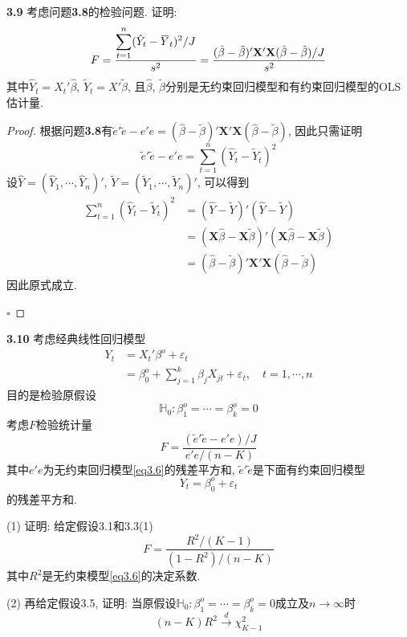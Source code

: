 \documentclass[cn,12pt,math=mtpro2,citestyle=gb7714-2015,bibstyle=gb7714-2015,twocol,mode=simple]{elegantbook}
\newcommand{\overbar}[1]{\mkern 1.5mu\overline{\mkern-1.5mu#1\mkern-1.5mu}\mkern 1.5mu}
\newcommand{\hbeta}{\hat{\beta}}
\newcommand{\tbeta}{\tilde{\beta}}
\begin{document}
\textbf{3.9} 考虑问题\textbf{3.8}的检验问题. 证明:
$$F=\frac{\displaystyle \sum_{t=1}^{n}(\hat{Y}_t-\overbar{Y}_t)^2/J}{s^2}=\frac{(\hbeta-\tbeta)'\mathbf{X}'\mathbf{X}(\hbeta-\tbeta)/J}{s^2}$$
其中$\hat{Y}_t=X_t'\hbeta$, $\tilde{Y}_t=X'\tbeta$, 且$\hbeta$, $\tbeta$分别是无约束回归模型和有约束回归模型的OLS估计量.

\begin{proof}
  根据问题\textbf{3.8}有$\tilde{e}'\tilde{e}-e'e=(\hbeta-\tbeta)'\mathbf{X}'\mathbf{X}(\hbeta-\tbeta)$, 因此只需证明
  $$\tilde{e}'\tilde{e}-e'e=\sum_{t=1}^{n}(\hat{Y}_t-\tilde{Y}_t)^2$$
  设$\hat{Y}=(\hat{Y}_1,\cdots,\hat{Y}_n)'$, $\tilde{Y}=(\tilde{Y}_1,\cdots,\tilde{Y}_n)'$, 可以得到
  \begin{align*}
 \sum_{t=1}^{n}(\hat{Y}_t-\tilde{Y}_t)^2&=(\hat{Y}-\tilde{Y})'(\hat{Y}-\tilde{Y}) \\
  &=(\mathbf{X}\hbeta-\mathbf{X}\tbeta)'(\mathbf{X}\hbeta-\mathbf{X}\tbeta) \\
  &=(\hbeta-\tbeta)'\mathbf{X}'\mathbf{X}(\hbeta-\tbeta)
  \end{align*}
  因此原式成立.

  $\square$
\end{proof}

\textbf{3.10} 考虑经典线性回归模型
\begin{align}
Y_t&=X_t'\beta^o+\varepsilon_t \nonumber \\
&=\beta_0^o+\sum_{j=1}^{k}\beta_jX_{jt}+\varepsilon_t,\quad t=1,\cdots,n \label{eq3.6} \tag{3.6}
\end{align}
目的是检验原假设
$$\mathbb{H}_0: \beta_1^o=\cdots=\beta^o_k=0$$
考虑$F$检验统计量
$$F=\frac{(\tilde{e}'\tilde{e}-e'e)/J}{e'e/(n-K)}$$
其中$e'e$为无约束回归模型\ref{eq3.6}的残差平方和, $\tilde{e}'\tilde{e}$是下面有约束回归模型
\begin{equation}\label{eq3.7}
  Y_t=\beta_0^o+\varepsilon_t \tag{3.7}
\end{equation}
的残差平方和.

(1) 证明: 给定假设3.1和3.3(1)
$$F=\frac{R^2/(K-1)}{(1-R^2)/(n-K)}$$
其中$R^2$是无约束模型\ref{eq3.6}的决定系数.

(2) 再给定假设3.5, 证明: 当原假设$\mathbb{H}_0:\beta_1^o=\cdots=\beta_k^o=0$成立及$n \rightarrow \infty$时
$$(n-K)R^2 \xrightarrow{d} \chi^2_{K-1}$$
\end{document}
